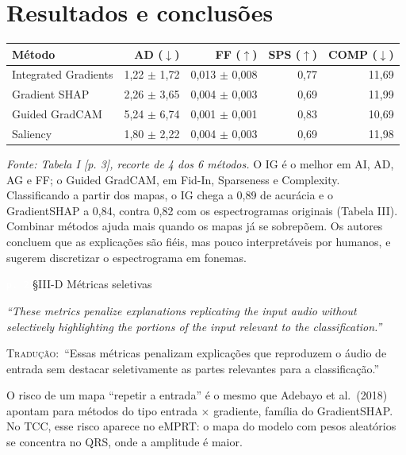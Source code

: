 \documentclass[11pt,a4paper]{article}
\newcommand{\pagechip}[1]{{\setlength{\fboxsep}{1.5pt}\colorbox{cAcc}{\textcolor{white}{\scriptsize\texttt{#1}}}}}
\newenvironment{origquote}{\par\itshape\small}{\par}
\newenvironment{tradquote}{\par\small\textsc{Tradução:}\ }{\par}
\newcommand{\explab}[1]{\par\smallskip{\small\color{cAcc}\textbf{\MakeUppercase{#1}}}\par}
\begin{document}
\section{Resultados e conclusões}
\begin{center}\small
\begin{tabular}{lrrrr}
\toprule
\textbf{Método} & \textbf{AD} ($\downarrow$) & \textbf{FF} ($\uparrow$) & \textbf{SPS} ($\uparrow$) & \textbf{COMP} ($\downarrow$) \\
\midrule
Integrated Gradients & 1,22 $\pm$ 1,72 & 0,013 $\pm$ 0,008 & 0,77 & 11,69 \\
Gradient SHAP & 2,26 $\pm$ 3,65 & 0,004 $\pm$ 0,003 & 0,69 & 11,99 \\
Guided GradCAM & 5,24 $\pm$ 6,74 & 0,001 $\pm$ 0,001 & 0,83 & 10,69 \\
Saliency & 1,80 $\pm$ 2,22 & 0,004 $\pm$ 0,003 & 0,69 & 11,98 \\
\bottomrule
\end{tabular}
\end{center}
\textit{Fonte: Tabela I [p. 3], recorte de 4 dos 6 métodos.} O IG é o melhor em AI, AD, AG e FF; o Guided GradCAM, em Fid-In, Sparseness e Complexity. Classificando a partir dos mapas, o IG chega a 0,89 de acurácia e o GradientSHAP a 0,84, contra 0,82 com os espectrogramas originais (Tabela III). Combinar métodos ajuda mais quando os mapas já se sobrepõem. Os autores concluem que as explicações são fiéis, mas pouco interpretáveis por humanos, e sugerem discretizar o espectrograma em fonemas.

\begin{citacard}{\pagechip{p. 2} §III-D Métricas seletivas}
\begin{origquote}“These metrics penalize explanations replicating the input audio without selectively highlighting the portions of the input relevant to the classification.”\end{origquote}
\begin{tradquote}“Essas métricas penalizam explicações que reproduzem o áudio de entrada sem destacar seletivamente as partes relevantes para a classificação.”\end{tradquote}
\explab{Explicação}
O risco de um mapa “repetir a entrada” é o mesmo que Adebayo et al.\ (2018) apontam para métodos do tipo entrada $\times$ gradiente, família do GradientSHAP. No TCC, esse risco aparece no eMPRT: o mapa do modelo com pesos aleatórios se concentra no QRS, onde a amplitude é maior.
\end{citacard}
\end{document}
